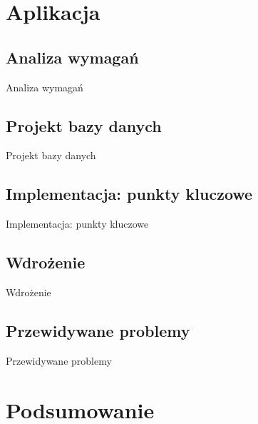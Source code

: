 \documentclass{beamer}
\begin{document}
\section{Aplikacja}

\subsection{Analiza wymagań}
\begin{frame}{Analiza wymagań} 

\end{frame}


\subsection{Projekt bazy danych}
\begin{frame}{Projekt bazy danych}

\end{frame}


\subsection{Implementacja: punkty kluczowe}
\begin{frame}{Implementacja: punkty kluczowe} 

\end{frame}


\subsection{Wdrożenie}
\begin{frame}{Wdrożenie} 

\end{frame}


\subsection{Przewidywane problemy}
\begin{frame}{Przewidywane problemy} 

\end{frame}


\section{Podsumowanie}
\end{document}
